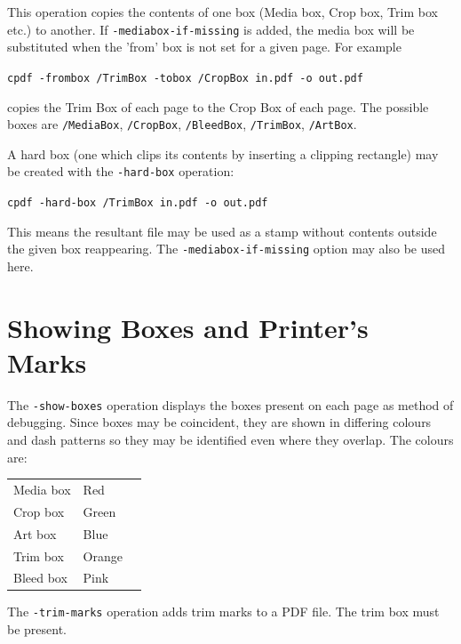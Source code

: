 \documentclass{book}
\begin{document}
  \noindent This operation copies the contents of one box (Media box, Crop box, Trim box etc.) to another. If \texttt{-mediabox-if-missing} is added, the media box will be substituted when the 'from' box is not set for a given page. For example

  \begin{framed}
    \noindent\small\verb!cpdf -frombox /TrimBox -tobox /CropBox in.pdf -o out.pdf!
  \end{framed}

  \noindent copies the Trim Box of each page to the Crop Box of each page. The possible boxes are \texttt{/MediaBox}, \texttt{/CropBox}, \texttt{/BleedBox}, \texttt{/TrimBox}, \texttt{/ArtBox}.\pagestyle{empty}\thispagestyle{fancy}

A hard box (one which clips its contents by inserting a clipping rectangle) may be created with the \texttt{-hard-box} operation:

  \begin{framed}
    \noindent\small\verb!cpdf -hard-box /TrimBox in.pdf -o out.pdf!
  \end{framed}

\noindent This means the resultant file may be used as a stamp without contents outside the given box reappearing. The \texttt{-mediabox-if-missing} option may also be used here.

\section{Showing Boxes and Printer's Marks}

The \texttt{-show-boxes} operation displays the boxes present on each page as method of debugging. Since boxes may be coincident, they are shown in differing colours and dash patterns so they may be identified even where they overlap. The colours are:

\medskip
\begin{tabular}{lll}
  Media box & Red& \\
  Crop box & Green& \\
  Art box & Blue& \\
  Trim box & Orange& \\
  Bleed box & Pink& 
\end{tabular}
\medskip

\noindent  The \texttt{-trim-marks} operation adds trim marks to a PDF file. The trim box must be present.
\thispagestyle{fancy}
\end{document}

